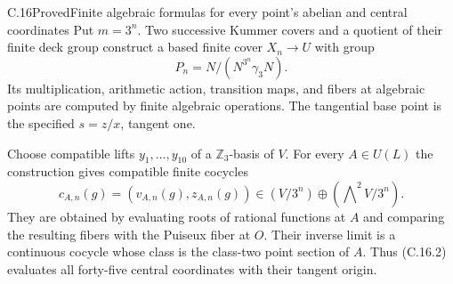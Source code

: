 \begin{statement}{C.16}{Proved}{Finite algebraic formulas for every point's abelian and central coordinates}
Put $m=3^n$.  Two successive Kummer covers and a quotient
of their finite deck group construct a based finite cover
$X_n\to U$ with group
\[
 P_n=N/(N^{3^n}\gamma_3N).                                  \tag{C.16.1}
\]
Its multiplication, arithmetic action, transition maps,
and fibers at algebraic points are computed by finite
algebraic operations.  The tangential base point is the
specified $s=z/x$, tangent one.

Choose compatible lifts $y_1,\ldots,y_{10}$ of a
$\mathbb Z_3$-basis of $V$.  For every $A\in U(L)$ the
construction gives compatible finite cocycles
\[
 c_{A,n}(g)=(v_{A,n}(g),z_{A,n}(g))
 \in(V/3^n)\oplus(\bigwedge\nolimits^2V/3^n).                \tag{C.16.2}
\]
They are obtained by evaluating roots of rational
functions at $A$ and comparing the resulting fibers
with the Puiseux fiber at $O$.  Their inverse limit
is a continuous cocycle whose class is the class-two
point section of $A$.  Thus (C.16.2) evaluates all
forty-five central coordinates with their tangent origin.
\end{statement}

